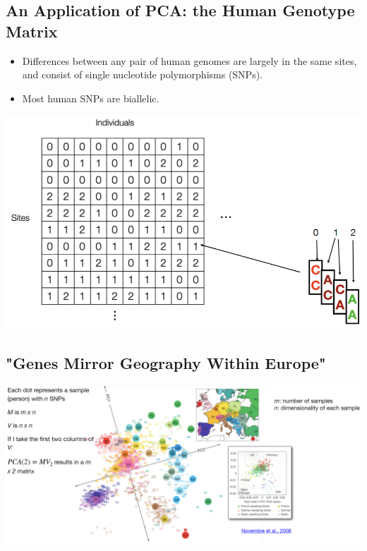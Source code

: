 \documentclass[10pt]{article}
\begin{document}
\subsection*{An Application of PCA: the Human Genotype Matrix}
\begin{itemize}
    \item Differences between any pair of human genomes are largely in the same sites, and consist of single nucleotide polymorphisms (SNPs).
    \item Most human SNPs are biallelic.
\end{itemize}
\begin{center}
    \includegraphics*[scale=0.8]{W8_3.png}
\end{center}


\subsection*{"Genes Mirror Geography Within Europe"}
\begin{center}
    \includegraphics*[scale=0.5]{W8_4.png}
\end{center}
\end{document}
